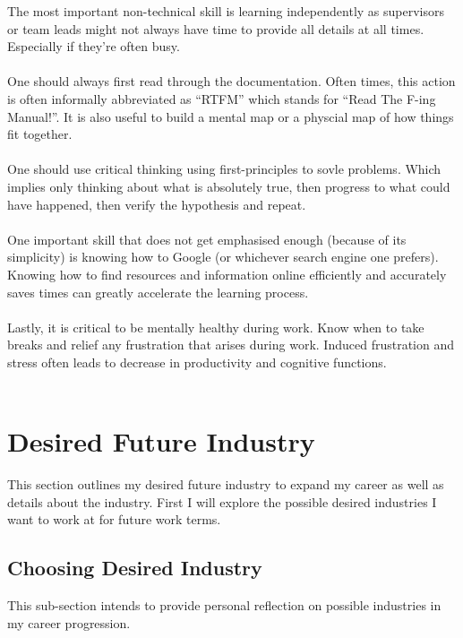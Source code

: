 \documentclass[10pt,letterpaper]{article}
\begin{document}
The most important non-technical skill is learning independently as supervisors or team leads might not always have time to provide all details at all times. Especially if they're often busy.\\
\\
One should always first read through the documentation. Often times, this action is often informally abbreviated as ``RTFM'' which stands for ``Read The F-ing Manual!''. It is also useful to build a mental map or a physcial map of how things fit together.\\
\\
One should use critical thinking using first-principles to sovle problems. Which implies only thinking about what is absolutely true, then progress to what could have happened, then verify the hypothesis and repeat.\\
\\
One important skill that does not get emphasised enough (because of its simplicity) is knowing how to Google (or whichever search engine one prefers). Knowing how to find resources and information online efficiently and accurately saves times can greatly accelerate the learning process.\\
\\
Lastly, it is critical to be mentally healthy during work. Know when to take breaks and relief any frustration that arises during work. Induced frustration and stress often leads to decrease in productivity and cognitive functions.\\
\\
\clearpage
\section{Desired Future Industry}\label{desired-future-industry}

This section outlines my desired future industry to expand my career as well as details about the industry. First I will explore the possible desired industries I want to work at for future work terms.

\subsection{Choosing Desired Industry}

This sub-section intends to provide personal reflection on possible industries in my career progression.\\
\end{document}
